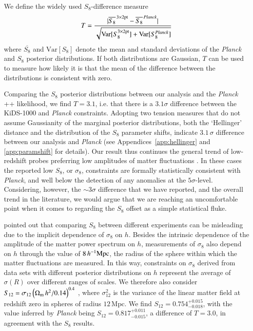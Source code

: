 We define the widely used $S_8$-difference measure
\begin{equation}
\label{eq: std_tension}
T = \frac{|\overline{S_{8}}^{\,\rm 3\times2pt}-\overline{S_{8}}^{\,\it Planck}|}{\sqrt{\mathrm{Var}[S_{8}^{\rm 3\times2pt}] + \mathrm{Var}[S_{8}^{\it Planck}]}}
\end{equation}
where $\overline{S_{8}}$ and $\mathrm{Var}[S_{8}] $ denote the mean and standard deviations of the {\it Planck} and \tttp $S_8$ posterior distributions.  If both distributions are Gaussian, $T$ can be used to measure how likely it is that the mean of the difference between the distributions is consistent with zero.

Comparing the $S_{8}$ posterior distributions between our \tttp analysis and the {\it Planck} ++ likelihood, we find $T=3.1$, i.e. that there is a $3.1\sigma$ difference between the KiDS-1000 and {\it Planck} constraints. 
%  
Adopting two tension measures that do not assume Gaussianity of the marginal posterior distributions, both the `Hellinger' distance and the distribution of the $S_{8}$ parameter shifts, indicate $3.1\,\sigma$ difference between our \tttp analysis and {\it Planck} (see Appendices~\ref{app:hellinger} and \ref{app:paramshift} for details).  
%
Our result thus continues the general trend of low-redshift probes preferring low amplitudes of matter fluctuations \citep{heymans/etal:2013, alam/etal:2017, abbott/etal:2018, hikage/etal:2019, bocquet/etal:2019, wright/etal:2020b,DESclusters/etal:2020}. 
In these cases the reported low $S_8$, or $\sigma_8$, constraints are formally statistically consistent with {\it Planck}, and well below the detection of any anomalies at the $5\sigma$-level. 
Considering, however, the $\sim 3\sigma$ difference that we have reported, and the overall trend in the literature, we would argue that we are reaching an uncomfortable point when it comes to regarding the $S_8$ offset as a simple statistical fluke.

\citet{Sanchez2020} pointed out that comparing $S_{8}$ between different experiments can be misleading due to the implicit dependence of $\sigma_{8}$ on $h$. 
Besides the intrinsic dependence of the amplitude of the matter power spectrum on $h$, measurements of $\sigma_{8}$ also depend on $h$ through the value of $8\,h^{-1}{\rm Mpc}$, the radius of the sphere within which the matter fluctuations are measured. 
In this way, constraints on $\sigma_8$ derived from data sets with different posterior distributions on $h$ represent the average of $\sigma(R)$ over different ranges of scales. 
%
We therefore also consider $S_{12} = \sigma_{12}\left(\Omega_{\rm m}\,h^2/0.14\right)^{0.4}$ \citep{Sanchez2020}, where $\sigma_{12}^{2}$ is the variance of the linear matter field at redshift zero in spheres of radius $12\,\mathrm{Mpc}$.
We find $S_{12} = 0.754^{+0.015}_{-0.018}$, with the value inferred by {\it Planck} being $S_{12} = 0.817_{-0.015}^{+0.011}
$, a difference of $T=3.0$, in agreement with the $S_8$ results. 

